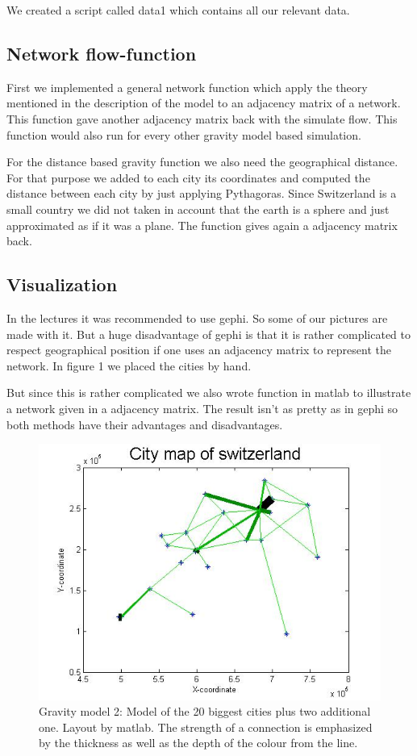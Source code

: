 \documentclass[11pt]{article}
\begin{document}
We created a script called data1 which contains all our relevant data.

\subsection{Network flow-function}
First we implemented a general network function which apply the theory mentioned in the description of the model to an adjacency matrix of a network. This function gave another adjacency matrix back with the simulate flow. This function would also run for every other gravity model based simulation.\newline

For the distance based gravity function we also need the geographical distance. For that purpose we added to each city its coordinates and computed the distance between each city by just applying Pythagoras. Since Switzerland is a small country we did not taken in account that the earth is a sphere and just approximated as if it was a plane. The function gives again a adjacency matrix back.


\subsection{Visualization}
In the lectures it was recommended to use gephi. So some of our pictures are made with it. But a huge disadvantage of gephi is that it is rather complicated to respect geographical position if one uses an adjacency  matrix to represent the network. In figure 1 we placed the cities by hand.

But since this is rather complicated we also wrote function in matlab to illustrate a network given in a adjacency matrix. The result isn't as pretty as in gephi so both methods have their advantages and disadvantages.


\begin{figure}
\centering
\includegraphics[scale=0.5]{switzerland_network2}
 \caption{Gravity model 2: Model of the 20 biggest cities plus two additional one. Layout by matlab. The strength of a connection is emphasized by the thickness as well as the depth of the colour from the line.}
\end{figure}
\end{document}

